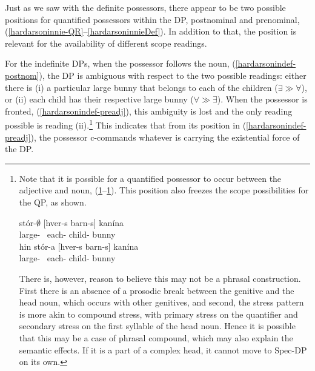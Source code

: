 \documentclass[output=paper]{langscibook}
\begin{document}
Just as we saw with the definite possessors, there appear to be two possible positions for quantified possessors within the DP, postnominal and prenominal, (\ref{hardarsoninnie-QR}--\ref{hardarsoninnieDef}). In addition to that, the position is relevant for the availability of different scope readings.

For the indefinite DPs, when the possessor follows the noun, (\ref{hardarsonindef-postnom}), the DP is ambiguous with respect to the two possible readings: either there is (i) a particular large bunny that belongs to each of the children ($\exists \gg \forall$), or (ii) each child has their respective large bunny ($\forall \gg \exists$). When the possessor is fronted, (\ref{hardarsonindef-preadj}), this ambiguity is lost and the only reading possible is reading (ii).\footnote{%
Note that it is possible for a quantified possessor to occur between the adjective and noun, (\ref{hardarsonindef-postadj}--\ref{hardarsondef-postadj}). This position also freezes the scope possibilities for the QP, as shown.

\begin{exe}
\ex \gll	stór-$\emptyset$ [hver-s barn-s] kanína \label{hardarsonindef-postadj}\\
			large-{\hardStr} ~each-{\hardGen} child-{\hardGen} bunny\\ \jambox*{$\exists \gg \forall$; *$\forall \gg \exists$}
\ex	\gll	hin stór-a [hver-s barn-s] kanína \label{hardarsondef-postadj}\\
			{\hardArt} large-{\hardWk} ~each-{\hardGen} child-{\hardGen} bunny\\ 
\end{exe}

There is, however, reason to believe this may not be a phrasal construction. First there is an absence of a prosodic break between the genitive and the head noun, which occurs with other genitives, and second, the stress pattern is more akin to compound stress, with primary stress on the quantifier and secondary stress on the first syllable of the head noun. Hence it is possible that this may be a case of phrasal compound, which may also explain the semantic effects. If it is a part of a complex head, it cannot move to Spec-DP on its own.}
This indicates that from its position in (\ref{hardarsonindef-preadj}), the possessor c-commands whatever is carrying the existential force of the DP.
\end{document}
